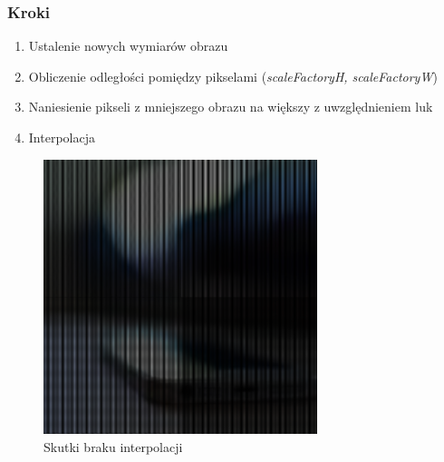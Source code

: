 \documentclass[a4paper,12pt]{book}
\begin{document}
\subsubsection*{Kroki}
\begin{enumerate}
	\item Ustalenie nowych wymiarów obrazu
	\item Obliczenie odległości pomiędzy pikselami (\textit{scaleFactoryH, scaleFactoryW})
	\item Naniesienie pikseli z mniejszego obrazu na większy z uwzględnieniem luk
	\item Interpolacja
\end{enumerate}
\begin{figure}
	\caption{Skutki braku interpolacji}
	\begin{center}
		\includegraphics[width=8cm, height=8cm]{phone-without-interpolation.png}
	\end{center}
\end{figure}
\end{document}
